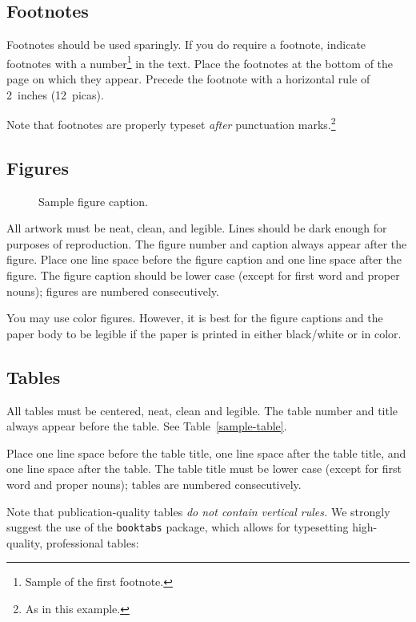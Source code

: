 \documentclass{article}
\begin{document}
\subsection{Footnotes}

Footnotes should be used sparingly. If you do require a footnote, indicate footnotes with a number\footnote{Sample of the first footnote.} in the text. Place the footnotes at the bottom of the page on which they appear. Precede the footnote with a horizontal rule of 2~inches (12~picas).

Note that footnotes are properly typeset \emph{after} punctuation marks.\footnote{As in this example.}

\subsection{Figures}

\begin{figure}
    \centering
    \fbox{\rule[-.5cm]{0cm}{4cm} \rule[-.5cm]{4cm}{0cm}}
    \caption{Sample figure caption.}
\end{figure}

All artwork must be neat, clean, and legible. Lines should be dark enough for purposes of reproduction. The figure number and caption always appear after the figure. Place one line space before the figure caption and one line space after the figure. The figure caption should be lower case (except for first word and proper nouns); figures are numbered consecutively.

You may use color figures. However, it is best for the figure captions and the paper body to be legible if the paper is printed in either black/white or in color.

\subsection{Tables}

All tables must be centered, neat, clean and legible. The table number and title always appear before the table. See Table~\ref{sample-table}.

Place one line space before the table title, one line space after the table title, and one line space after the table. The table title must be lower case (except for first word and proper nouns); tables are numbered consecutively.

Note that publication-quality tables \emph{do not contain vertical rules.} We strongly suggest the use of the \verb+booktabs+ package, which allows for typesetting high-quality, professional tables:
\end{document}
